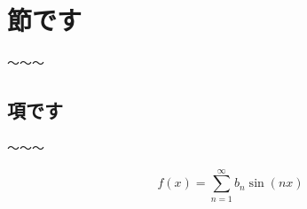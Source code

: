 \section{節です}

〜〜〜

\subsection{項です}

〜〜〜

\begin{equation}
	f(x) = \sum_{n=1}^{\infty} b_n \sin(nx)
\end{equation}
